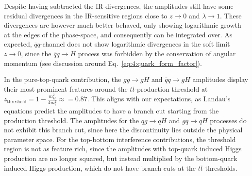 Despite having subtracted the \acs{IR}-divergences, the amplitudes still have some residual divergences in the \acs{IR}-sensitive regions close to $z \rightarrow 0$ and $\lambda \rightarrow 1$. These divergences are however much better behaved, only showing logarithmic growth at the edges of the phase-space, and consequently can be integrated over. As expected, $\bar{q}q$-channel does not show logarithmic divergences in the soft limit $z \rightarrow 0$, since the $\bar{q} q \rightarrow H$ process was forbidden by the conservation of angular momentum (see discussion around Eq.~\eqref{eq:4:quark_form_factor}).

In the pure-top-quark contribution, the $gg \rightarrow g H$ and $\bar{q}q \rightarrow g H$ amplitudes display their most prominent features around the $t\bar{t}$-production threshold at $z_{\mathrm{threshold}} = 1 - \frac{m_H^2}{4 m_t^2} \approx = 0.87$. This aligns with our expectations, as Landau's equations predict the amplitudes to have a branch cut starting from the production threshold. The amplitudes for the $qg \rightarrow qH$ and $g \bar{q} \rightarrow \bar{q} H$ processes do not exhibit this branch cut, since here the discontinuity lies outside the physical parameter space. For the top-bottom interference contributions, the threshold region is not as feature rich, since the amplitudes with top-quark induced Higgs production are no longer squared, but instead multiplied by the bottom-quark induced Higgs production, which do not have branch cuts at the $t\bar{t}$-thresholds.

